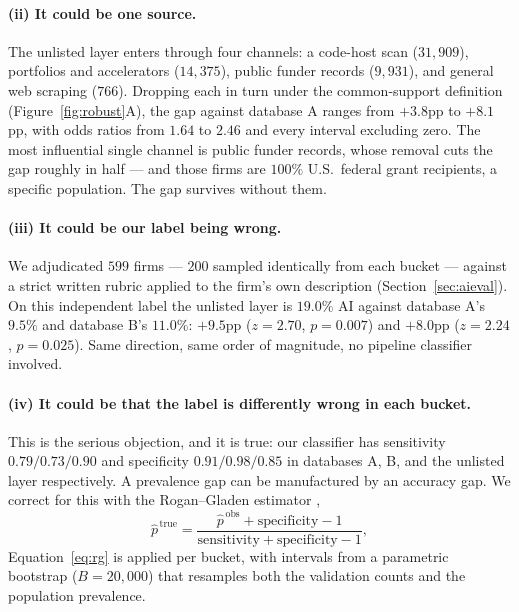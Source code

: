\documentclass[11pt]{article}
\begin{document}
\paragraph{(ii) It could be one source.}
The unlisted layer enters through four channels: a code-host scan
($31{,}909$), portfolios and accelerators ($14{,}375$), public funder records
($9{,}931$), and general web scraping ($766$). Dropping each in turn under the
common-support definition (Figure~\ref{fig:robust}A), the gap against database
A ranges from $+3.8$pp to $+8.1$pp, with odds ratios from $1.64$ to $2.46$ and
every interval excluding zero. The most influential single channel is public
funder records, whose removal cuts the gap roughly in half --- and those firms
are $100\%$ U.S.\ federal grant recipients, a specific population. The gap
survives without them.

\paragraph{(iii) It could be our label being wrong.}
We adjudicated $599$ firms --- $200$ sampled identically from each bucket ---
against a strict written rubric applied to the firm's own description
(Section~\ref{sec:aieval}). On this independent label the unlisted layer is
$19.0\%$ AI against database A's $9.5\%$ and database B's $11.0\%$: $+9.5$pp
($z=2.70$, $p=0.007$) and $+8.0$pp ($z=2.24$, $p=0.025$). Same direction, same
order of magnitude, no pipeline classifier involved.

\paragraph{(iv) It could be that the label is differently wrong in each bucket.}
This is the serious objection, and it is true: our classifier has sensitivity
$0.79/0.73/0.90$ and specificity $0.91/0.98/0.85$ in databases A, B, and the
unlisted layer respectively. A prevalence gap can be manufactured by an
accuracy gap. We correct for this with the Rogan--Gladen estimator
\citep{rogan1978prevalence},
\begin{equation}
\label{eq:rg}
\hat{p}^{\,\text{true}} = \frac{\hat{p}^{\,\text{obs}} + \text{specificity} - 1}
                               {\text{sensitivity} + \text{specificity} - 1},
\end{equation}
Equation~\eqref{eq:rg} is applied per bucket, with intervals from a parametric bootstrap
($B = 20{,}000$) that resamples both the validation counts and the population
prevalence.
\end{document}
